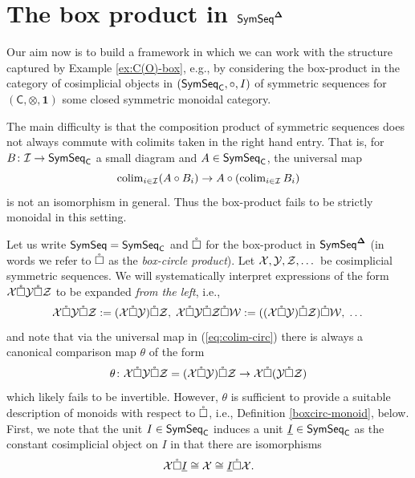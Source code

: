 \section{The box product in $\mathsf{SymSeq}^{\mathbf{\Delta}}$}
Our aim now is to build a framework in which we can work with the structure captured by Example \ref{ex:C(O)-box}, e.g.,  by considering the box-product in the category of cosimplicial objects in $(\mathsf{SymSeq}_{\mathsf{C}}, \circ, I)$ of symmetric sequences for $(\mathsf{C},\otimes, \mathbf{1})$ some closed symmetric monoidal category. 

The main difficulty is that the composition product of symmetric sequences does not always commute with colimits taken in the right hand entry. That is, for $B\colon \mathcal{I}\to \mathsf{SymSeq}_{\mathsf{C}}$ a small diagram and $A\in \mathsf{SymSeq}_{\mathsf{C}}$, the universal map \begin{equation} \label{eq:colim-circ}\operatorname{colim}_{i\in \mathcal{I}} (A\circ B_i) \to A \circ (\operatorname{colim}_{i\in \mathcal{I}} B_i) \end{equation} is not an isomorphism in general. Thus the box-product fails to be strictly monoidal in this setting. 

Let us write $\mathsf{SymSeq}=\mathsf{SymSeq}_{\mathsf{C}}$ and $\mathring{\square}$ for the box-product in $\mathsf{SymSeq}^{\mathbf{\Delta}}$ (in words we refer to $\mathring{\square}$ as the \textit{box-circle product}). Let $\mathcal{X},\mathcal{Y},\mathcal{Z}, \dots$ be cosimplicial symmetric sequences. We will systematically interpret expressions of the form $\mathcal{X} \mathring{\square} \mathcal{Y} \mathring{\square} \mathcal{Z}$ to be expanded \textit{from the left}, i.e., 
    \[\mathcal{X} \mathring{\square} \mathcal{Y} \mathring{\square} \mathcal{Z} := (\mathcal{X} \mathring{\square} \mathcal{Y}) \mathring{\square} \mathcal{Z}, \; \mathcal{X} \mathring{\square} \mathcal{Y} \mathring{\square} \mathcal{Z} \mathring{\square} \mathcal{W} := ((\mathcal{X} \mathring{\square} \mathcal{Y}) \mathring{\square} \mathcal{Z} ) \mathring{\square} \mathcal{W}, \;\dots \]
and note that via the universal map in (\ref{eq:colim-circ}) there is always a canonical comparison map $\theta$ of the form    
    \begin{equation} \label{eq:theta} \theta\colon  \mathcal{X}\mathring{\square} \mathcal{Y}\mathring{\square} \mathcal{Z}=(\mathcal{X} \mathring{\square} \mathcal{Y}) \mathring{\square} \mathcal{Z}  \to \mathcal{X} \mathring{\square} (\mathcal{Y} \mathring{\square} \mathcal{Z})\end{equation}
which likely fails to be invertible. However, $\theta$ is sufficient to provide a suitable description of monoids with respect to $\mathring{\square}$, i.e., Definition \ref{boxcirc-monoid}, below. First, we note that the unit $I\in \mathsf{SymSeq}_{\mathsf{C}}$ induces a unit $\underline{I} \in \mathsf{SymSeq}_{\mathsf{C}}$ as the constant cosimplicial object on $I$ in that there are isomorphisms \[ \mathcal{X} \mathring{\square} \underline{I} \cong \mathcal{X} \cong \underline{I} \mathring{\square} \mathcal{X}.\] 


